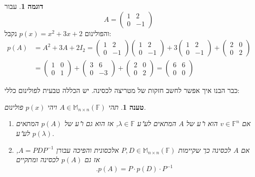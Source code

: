 \documentclass[12pt]{report}
\theoremstyle{plain}
\newtheorem{proposition}[theorem]{טענה}
\theoremstyle{definition}
\newtheorem{example}{דוגמה}[chapter]
\newcommand{\F}{\mathbb{F}}
\newcommand{\M}{\mathbb{M}}
\newcommand{\0}{\mathbf{0}}
\begin{document}
\begin{example}
עבור
$$
A=\begin{pmatrix}
1 & 2 \\
0 & -1
\end{pmatrix}
$$
והפולינום 
$p(x)=x^2+3x+2$
נקבל:
$$
\begin{aligned}
p(A)&=A^2+3A+2I_2=\begin{pmatrix}
1 & 2 \\
0 & -1
\end{pmatrix}\begin{pmatrix}
1 & 2 \\
0 & -1
\end{pmatrix}+3\begin{pmatrix}
1 & 2 \\
0 & -1
\end{pmatrix}+\begin{pmatrix}
2 & 0 \\
0 & 2
\end{pmatrix} \\
&=\begin{pmatrix}
1 & 0 \\
0 & 1
\end{pmatrix}+\begin{pmatrix}
3 & 6 \\
0 & -3
\end{pmatrix}+\begin{pmatrix}
2 & 0 \\
0 & 2
\end{pmatrix}=\begin{pmatrix}
6 & 6 \\
0 & 0
\end{pmatrix}
\end{aligned}
$$
\end{example}

כבר הבנו איך אפשר לחשב חזקות של מטריצה לכסינה. יש הכללה טבעית לפולינום כללי:

\begin{proposition}\label{prop:matrix-poly}
תהי
$A\in\M_{n\times n}(\F)$
ויהי
$p(x)$
פולינום.
\begin{enumerate}[label=\alph*.]
\item 
אם
$v\in\F^n$
הוא ו"ע של 
$A$
המתאים לע"ע
$\lambda\in\F$,
אז הוא גם ו"ע של
$p(A)$
המתאים לע"ע
$p(\lambda)$.


\item
אם
$A$
לכסינה כך שקיימות
$P,D\in\M_{n\times n}(\F)$
אלכסונית והפיכה עבורן
$A=PDP^{-1}$,
אז גם
$p(A)$
לכסינה ומתקיים
$$
.p(A)=P\cdot p(D)\cdot P^{-1}
$$


\end{enumerate}
\end{proposition}
\end{document}
